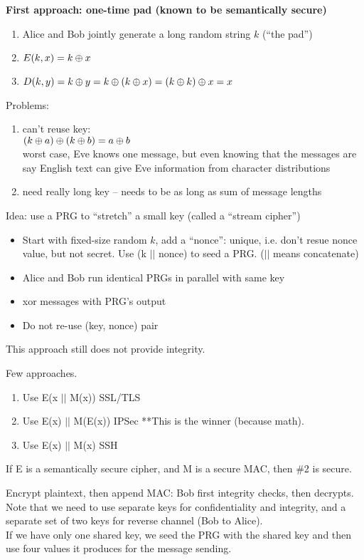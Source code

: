 {\bf First approach: one-time pad (known to be semantically secure)}
\begin{enumerate}
    \item Alice and Bob jointly generate a long random string $k$ (``the pad'')
    \item $E(k, x) = k \oplus x$
    \item $D(k, y) = k \oplus y = k \oplus (k \oplus x) = (k \oplus k) \oplus x = x$
\end{enumerate}
Problems:
\begin{enumerate}
    \item can't reuse key:\\
        $(k \oplus a) \oplus (k \oplus b) = a \oplus b$\\
        worst case, Eve knows one message, but even knowing that the messages
        are say English text can give Eve information from character
        distributions
    \item need really long key -- needs to be as long as sum of message lengths
\end{enumerate}
Idea: use a PRG to ``stretch'' a small key (called a ``stream cipher'')
\begin{itemize}
    \item Start with fixed-size random $k$, add a ``nonce'': unique, i.e. don't resue nonce value,
      but not secret.  Use (k $||$ nonce) to seed a PRG. ($||$ means concatenate)
    \item Alice and Bob run identical PRGs in parallel with same key
    \item xor messages with PRG's output
    \item Do not re-use (key, nonce) pair
\end{itemize}
  This approach still does not provide integrity.

Few approaches.
\begin{enumerate}
  \item Use E(x $||$ M(x)) \hspace{1cm}SSL/TLS
  \item Use E(x) $||$ M(E(x)) \hspace{1cm}IPSec  **This is the winner (because math).
  \item Use E(x) $||$ M(x) \hspace{1cm}SSH\\
\end{enumerate}

\begin{theorem}
If E is a semantically secure cipher, and M is a secure MAC, then \#2 is secure.
\end{theorem}

Encrypt plaintext, then append MAC: Bob first integrity checks, then decrypts.
Note that we need to use separate keys for confidentiality and integrity, and a
separate set of two keys for reverse channel (Bob to Alice).\\

If we have only one shared key, we seed the PRG with the shared key and then use
four  values it produces for the message sending.

